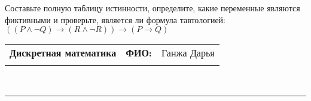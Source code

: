 \documentclass[10pt]{exam}
\newcommand{\class}{Дискретная математика}
\newcommand{\examdate}{}
\begin{document}
\begin{questions}
\begin{enumerate} [a)]
\end{enumerate}\question Составьте полную таблицу истинности, определите, какие переменные являются фиктивными и проверьте, является ли формула тавтологией:
$(( P \land \neg Q) \rightarrow (R \land \neg R)) \rightarrow (P \rightarrow Q)$

\end{questions}
\newpage
\begin{flushright}
\begin{tabular}{p{2.8in} r l}
\textbf{\class} & \textbf{ФИО:} &Ганжа Дарья
\\

\textbf{\examdate} &&\\
\end{tabular}\\
\end{flushright}
\rule[1ex]{\textwidth}{.1pt}
\end{document}
